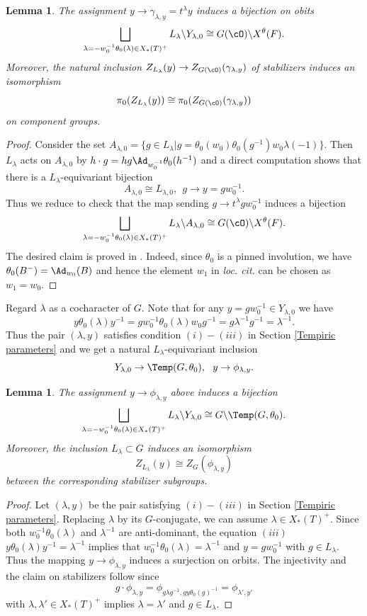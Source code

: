 \documentclass[12pt]{amsart}
\newtheorem{lem}[thm]{Lemma}
\theoremstyle{remark}
\begin{document}
\begin{lem}\label{Y=X}
    The assignment $y\to \gamma_{\lambda,y}=t^\lambda y$
    induces a bijection on obits
    \[
    \bigsqcup_{\lambda=-w_0^{-1}\theta_0(\lambda)\in X_*(T)^+} L_\lambda\backslash Y_{\lambda,0}
    \cong G(\cO)\backslash X^\theta(F).
    \]
    Moreover, the natural inclusion $Z_{L_\lambda}(y)\to Z_{G(\cO)}(\gamma_{\lambda,y})$ of stabilizers 
    induces an isomorphism
    \[\pi_0(Z_{L_\lambda}(y))\cong\pi_0(Z_{G(\cO)}(\gamma_{\lambda,y}))\]
    on component groups.
\end{lem}
\begin{proof}
    Consider the set 
    $A_{\lambda,0}=\{g\in L_\lambda|g=\theta_0(w_0)\theta_0(g^{-1})w_0\lambda (-1)\}$.
    Then $L_\lambda$ acts on $A_{\lambda,0}$ by 
    $h\cdot g=hg\Ad_{w_0^{-1}}\theta_0(h^{-1})$ and a direct computation shows that there is a 
   $L_\lambda$-equivariant bijection 
    \[A_{\lambda,0}\cong L_{\lambda,0}, \ \ g\to y=gw_0^{-1}.\]
Thus we reduce to check that 
the map sending $g\to t^\lambda gw_0^{-1}$
induces a bijection
\[\bigsqcup_{\lambda=-w_0^{-1}\theta_0(\lambda)\in X_*(T)^+} L_\lambda\backslash A_{\lambda,0}\cong G(\cO)\backslash X^\theta(F).\]
The desired claim is proved in \cite[Theorem 13]{CY}.
Indeed, since $\theta_0$ is a pinned involution, we have $\theta_0(B^-)=\Ad_{w_0}(B)$ and hence 
the element $w_1$ in \emph{loc. cit.} can be chosen as $w_1=w_0$.
\end{proof}

Regard $\lambda$ as a cocharacter of $G$.
Note that for any $y=gw_0^{-1}\in Y_{\lambda,0}$ 
we have 
\[y\theta_0(\lambda)y^{-1}=gw_0^{-1}\theta_0(\lambda)w_0g^{-1}=g\lambda^{-1}g^{-1}=\lambda^{-1}.\]
Thus the pair $(\lambda,y)$ satisfies condition $(i)-(iii)$
in Section \ref{Tempiric parameters} and we get a natural $L_\lambda$-equivariant inclusion
\[Y_{\lambda,0}\to\Temp(G,\theta_0),\ \ y\to \phi_{\lambda,y}.\]


\begin{lem}\label{Y=T}
    The assignment $y\to \phi_{\lambda,y}$ above induces a 
    bijection
    \[\bigsqcup_{\lambda=-w_0^{-1}\theta_0(\lambda)\in X_*(T)^+} L_\lambda\backslash Y_{\lambda,0}\cong G\backslash \Temp(G,\theta_0).\]
    Moreover, the inclusion $L_\lambda\subset G$ induces an isomorphism
  \[Z_{L_\lambda}(y)\cong Z_{G}(\phi_{\lambda,y})\]
  between the corresponding stabilizer subgroups.
\end{lem}
\begin{proof}
Let $(\lambda,y)$ be the pair satisfying $(i)-(iii)$ in Section \ref{Tempiric parameters}.
Replacing $\lambda$ by its $G$-conjugate, we can assume 
$\lambda\in X_*(T)^+$. Since both $w_0^{-1}\theta_0(\lambda)$ and $\lambda^{-1}$ are anti-dominant, 
the equation $(iii)$ $y\theta_0(\lambda)y^{-1}=\lambda^{-1}$ implies that 
$w_0^{-1}\theta_0(\lambda)=\lambda^{-1}$ and
$y=gw_0^{-1}$ with $g\in L_\lambda$. Thus the mapping 
$y\to \phi_{\lambda,y}$ induces a surjection on orbits.
The injectivity and the claim on stabilizers follow
 since \[g\cdot\phi_{\lambda,y}=\phi_{g\lambda g^{-1},gy\theta_0(g)^{-1}}=\phi_{\lambda',y'}\]
with $\lambda,\lambda'\in X_*(T)^+$
implies  $\lambda=\lambda'$ and $g\in L_\lambda$.
\end{proof}
\end{document}
